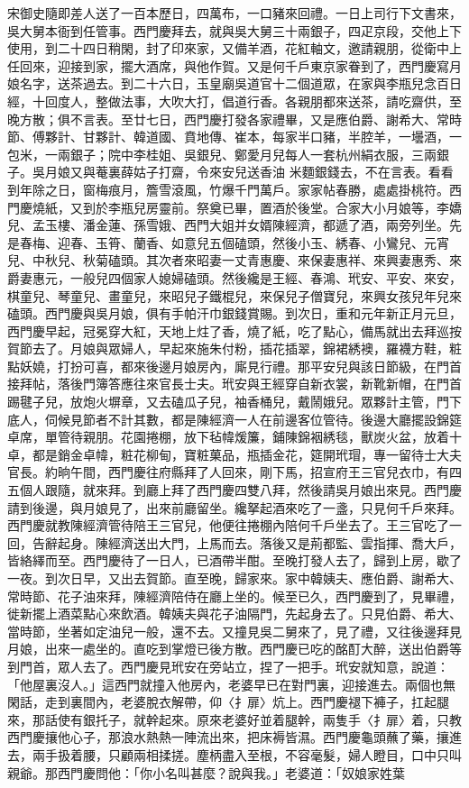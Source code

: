 宋御史隨即差人送了一百本歷日，四萬布，一口豬來回禮。一日上司行下文書來，吳大舅本衙到任管事。西門慶拜去，就與吳大舅三十兩銀子，四疋京段，交他上下使用，到二十四日稍閑，封了印來家，又備羊酒，花紅軸文，邀請親朋，從衛中上任回來，迎接到家，擺大酒席，與他作賀。又是何千戶東京家眷到了，西門慶寫月娘名字，送茶過去。到二十六日，玉皇廟吳道官十二個道眾，在家與李瓶兒念百日經，十回度人，整做法事，大吹大打，倡道行香。各親朋都來送茶，請吃齋供，至晚方散；俱不言表。至廿七日，西門慶打發各家禮畢，又是應伯爵、謝希大、常時節、傅夥計、甘夥計、韓道國、賁地傳、崔本，每家半口豬，半腔羊，一壜酒，一包米，一兩銀子；院中李桂姐、吳銀兒、鄭愛月兒每人一套杭州絹衣服，三兩銀子。吳月娘又與菴裏薛姑子打齋，令來安兒送香油 米麵銀錢去，不在言表。看看到年除之日，窗梅痕月，簷雪滾風，竹爆千門萬戶。家家帖春勝，處處掛桃符。西門慶燒紙，又到於李瓶兒房靈前。祭奠已畢，置酒於後堂。合家大小月娘等，李嬌兒、孟玉樓、潘金蓮、孫雪娥、西門大姐并女婿陳經濟，都遞了酒，兩旁列坐。先是春梅、迎春、玉筲、蘭香、如意兒五個磕頭，然後小玉、綉春、小鸞兒、元宵兒、中秋兒、秋菊磕頭。其次者來昭妻一丈青惠慶、來保妻惠祥、來興妻惠秀、來爵妻惠元，一般兒四個家人媳婦磕頭。然後纔是王經、春鴻、玳安、平安、來安，棋童兒、琴童兒、畫童兒，來昭兒子鐵棍兒，來保兒子僧寶兒，來興女孩兒年兒來磕頭。西門慶與吳月娘，俱有手帕汗巾銀錢賞賜。到次日，重和元年新正月元旦，西門慶早起，冠冕穿大紅，天地上炷了香，燒了紙，吃了點心，備馬就出去拜巡按賀節去了。月娘與眾婦人，早起來施朱付粉，插花插翠，錦裙綉襖，羅襪方鞋，粧點妖嬈，打扮可喜，都來後邊月娘房內，廝見行禮。那平安兒與該日節級，在門首接拜帖，落後門簿答應往來官長士夫。玳安與王經穿自新衣裳，新靴新帽，在門首踢毽子兒，放炮火塀章，又去磕瓜子兒，袖香桶兒，戴鬧娥兒。眾夥計主管，門下底人，伺候見節者不計其數，都是陳經濟一人在前邊客位管待。後邊大廳擺設錦筵卓席，單管待親朋。花園捲棚，放下毡幃煖簾，鋪陳錦裀綉毯，獸炭火盆，放着十卓，都是銷金卓幃，粧花柳甸，寶粧菓品，瓶插金花，筵開玳瑁，專一留待士大夫官長。約晌午間，西門慶往府縣拜了人回來，剛下馬，招宣府王三官兒衣巾，有四五個人跟隨，就來拜。到廳上拜了西門慶四雙八拜，然後請吳月娘出來見。西門慶請到後邊，與月娘見了，出來前廳留坐。纔拏起酒來吃了一盞，只見何千戶來拜。西門慶就教陳經濟管待陪王三官兒，他便往捲棚內陪何千戶坐去了。王三官吃了一回，告辭起身。陳經濟送出大門，上馬而去。落後又是荊都監、雲指揮、喬大戶，皆絡繹而至。西門慶待了一日人，已酒帶半酣。至晚打發人去了，歸到上房，歇了一夜。到次日早，又出去賀節。直至晚，歸家來。家中韓姨夫、應伯爵、謝希大、常時節、花子油來拜，陳經濟陪侍在廳上坐的。候至已久，西門慶到了，見畢禮，徙新擺上酒菜點心來飲酒。韓姨夫與花子油隔門，先起身去了。只見伯爵、希大、當時節，坐著如定油兒一般，還不去。又撞見吳二舅來了，見了禮，又往後邊拜見月娘，出來一處坐的。直吃到掌燈已後方散。西門慶已吃的酩酊大醉，送出伯爵等到門首，眾人去了。西門慶見玳安在旁站立，捏了一把手。玳安就知意，說道：「他屋裏沒人。」這西門就撞入他房內，老婆早已在對門裏，迎接進去。兩個也無閑話，走到裏間內，老婆脫衣解帶，仰〈扌扉〉炕上。西門慶褪下褲子，扛起腿來，那話使有銀托子，就幹起來。原來老婆好並着腿幹，兩隻手〈扌扉〉着，只教西門慶攘他心子，那浪水熱熱一陣流出來，把床褥皆濕。西門慶龜頭蘸了藥，攘進去，兩手扱着腰，只顧兩相揉搓。塵柄盡入至根，不容毫髮，婦人瞪目，口中只叫親爺。那西門慶問他：「你小名叫甚麼？說與我。」老婆道：「奴娘家姓葉